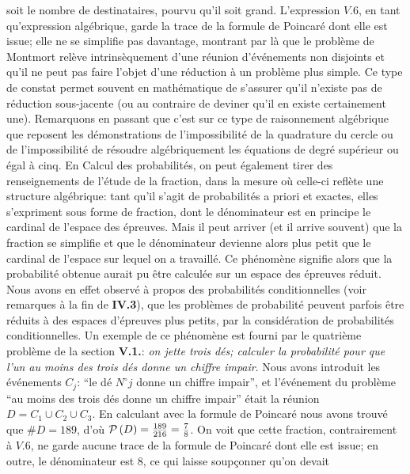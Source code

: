 soit  le nombre de destinataires, pourvu qu'il soit grand.
\medskip
L'expression $V.6$, en tant qu'expression alg\'ebrique, garde la trace    
de la formule de Poincar\'e dont elle est issue; elle ne se simplifie pas
davantage, montrant par l\`a que le probl\`eme de Montmort rel\`eve
intrins\`equement d'une r\'eunion d'\'ev\'enements non disjoints et 
qu'il ne peut pas faire l'objet d'une r\'eduction \`a un probl\`eme plus
simple. Ce type de constat permet souvent en math\'ematique de 
s'assurer qu'il n'existe pas de r\'eduction sous-jacente (ou au contraire
de deviner qu'il en existe certainement une). Remarquons en passant que
c'est sur ce  type  de raisonnement alg\'ebrique que reposent les 
d\'emonstrations de  l'impossibilit\'e  de la quadrature du cercle ou de
l'impossibilit\'e de r\'esoudre alg\'ebriquement les \'equations de 
degr\'e sup\'erieur ou \'egal \`a cinq. En Calcul des probabilit\'es, on 
peut \'egalement tirer des renseignements de l'\'etude de la fraction,
dans la mesure o\`u celle-ci refl\`ete une structure alg\'ebrique: 
tant qu'il s'agit de probabilit\'es a priori et exactes, elles s'expriment
sous forme de fraction, dont le d\'enominateur est en principe le 
cardinal de l'espace des \'epreuves. Mais il peut arriver (et il arrive
souvent) que la fraction se simplifie et que le d\'enominateur devienne
alors plus petit que le cardinal de l'espace sur lequel on a travaill\'e. Ce
ph\'enom\`ene  signifie alors que la probabilit\'e obtenue aurait pu \^etre
calcul\'ee  sur un espace des \'epreuves r\'eduit. Nous avons en effet
observ\'e \`a propos des probabilit\'es conditionnelles (voir remarques 
\`a la fin de {\bf IV.3}), que les probl\`emes de probabilit\'e peuvent 
parfois \^etre r\'eduits \`a des espaces d'\'epreuves plus petits, par la
consid\'eration de probabilit\'es conditionnelles.  
\medskip
Un exemple de ce ph\'enom\`ene est fourni par le quatri\`eme probl\`eme
de la section {\bf V\ata .1.}:  {\sl on jette trois d\'es; calculer la
probabilit\'e pour que l'un au moins des trois d\'es donne un chiffre
impair}.  Nous avons introduit les \'ev\'enements $C_j$:  ``le d\'e 
$N^\circ j$ donne un chiffre impair'',  et l'\'ev\'enement du probl\`eme 
 ``au moins des trois d\'es donne un chiffre impair'' \'etait la r\'eunion 
$D = C_1 \cup C_2 \cup C_3$.  En calculant avec la formule de Poincar\'e
nous avons trouv\'e que  $\#D = 189$,  d'o\`u ${\cal P}\, (D) = {189 \over
216} = {7 \over 8}$.  On voit que cette fraction,  contrairement \`a $V.6$, 
ne garde aucune trace de la formule de Poincar\'e dont elle est issue;  en
outre,  le d\'enominateur est $8$,  ce qui laisse soup\c{c}onner qu'on devait
